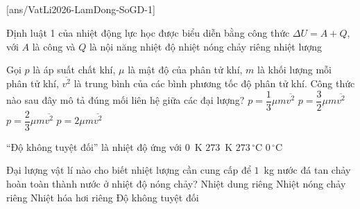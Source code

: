 	\noindent
	\subsection*{}
	\setcounter{ex}{0}
	[ans/VatLi2026-LamDong-SoGD-1]

	\begin{ex}%
		Định luật 1 của nhiệt động lực học được biểu diễn bằng công thức $\Delta U=A+Q$, với $A$ là công và $Q$ là
		\choice
		{nội năng}
		{nhiệt độ}
		{nhiệt nóng chảy riêng}
		{\True nhiệt lượng}
	\end{ex}

	\begin{ex}%
		Gọi $p$ là áp suất chất khí, $\mu$ là mật độ của phân tử khí, $m$ là khối lượng mỗi phân tử khí, $\overline{v^2}$ là trung bình của các bình phương tốc độ phân tử khí. Công thức nào sau đây mô tả đúng mối liên hệ giữa các đại lượng?
		\choice
		{\True $p=\dfrac{1}{3}\mu m\overline{v^2}$}
		{$p=\dfrac{3}{2}\mu m\overline{v^2}$}
		{$p=\dfrac{2}{3}\mu m\overline{v^2}$}
		{$p=2\mu m\overline{v^2}$}
	\end{ex}

	\begin{ex}%
		``Độ không tuyệt đối'' là nhiệt độ ứng với
		\choice
		{\True $0$~K}
		{$273$~K}
		{$273\,^\circ\text{C}$}
		{$0\,^\circ\text{C}$}
	\end{ex}

	\begin{ex}%
		Đại lượng vật lí nào cho biết nhiệt lượng cần cung cấp để $1$~kg nước đá tan chảy hoàn toàn thành nước ở nhiệt độ nóng chảy?
		\choice
		{Nhiệt dung riêng}
		{\True Nhiệt nóng chảy riêng}
		{Nhiệt hóa hơi riêng}
		{Độ không tuyệt đối}
	\end{ex}

